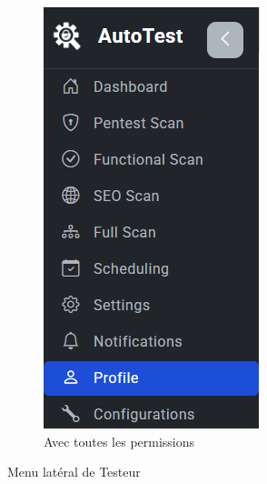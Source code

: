 \begin{justify}
\begin{enumerate}[label=\Alph*.]
\begin{figure}[H]
\begin{subfigure}[b]{0.32\linewidth}
                        \includegraphics[width=0.9\linewidth]{chapitres/ch3Sp1/section/sprint1/img/interface/all-permssion-sidebar.PNG}
                        \caption{Avec toutes les permissions}
                    \end{subfigure}
                    \caption{Menu latéral de Testeur}
                    \label{fig:sidebar}
                \end{figure}
                \begin{figure}[H]
                    \centering

\end{figure}
\end{enumerate}
\end{justify}
